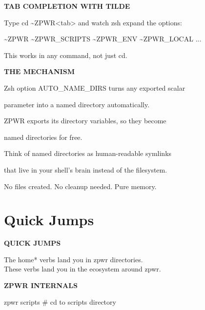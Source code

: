 \documentclass[11pt,a4paper,twoside]{book}
\begin{document}
\vspace{12pt}
{\bfseries\color{neonyellow} TAB COMPLETION WITH TILDE}\vspace{4pt}

Type cd \textasciitilde{}ZPWR<tab> and watch zsh expand the options:

\textasciitilde{}ZPWR  \textasciitilde{}ZPWR\_SCRIPTS  \textasciitilde{}ZPWR\_ENV  \textasciitilde{}ZPWR\_LOCAL ...

This works in any command, not just cd.


\vspace{12pt}
{\bfseries\color{neonyellow} THE MECHANISM}\vspace{4pt}

Zsh option AUTO\_NAME\_DIRS turns any exported scalar

parameter into a named directory automatically.

ZPWR exports its directory variables, so they become

named directories for free.

Think of named directories as human-readable symlinks

that live in your shell's brain instead of the filesystem.

No files created. No cleanup needed. Pure memory.


\vspace{16pt}

\section{Quick Jumps}


\vspace{10pt}
{\large\bfseries\color{neoncyan} QUICK JUMPS}\vspace{6pt}

\begin{codebox}
The home* verbs land you in zpwr directories.\\
These verbs land you in the ecosystem around zpwr.\\
\end{codebox}


\vspace{12pt}
{\bfseries\color{neonyellow} ZPWR INTERNALS}\vspace{4pt}

\begin{codebox}
zpwr scripts       \# cd to scripts directory\\
\end{codebox}
\end{document}
